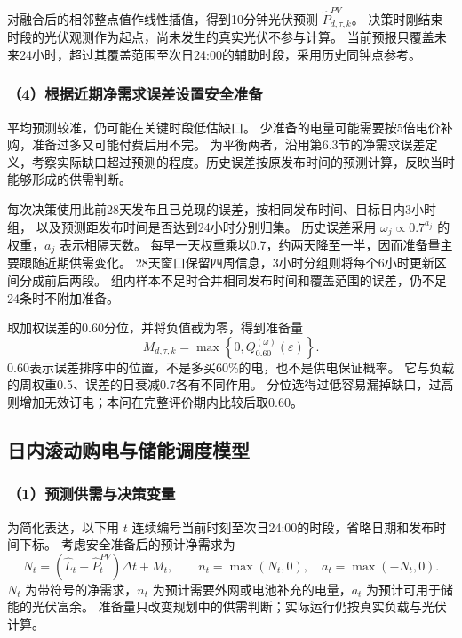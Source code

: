 对融合后的相邻整点值作线性插值，得到10分钟光伏预测 $\widehat P^{PV}_{d,\tau,k}$。
决策时刚结束时段的光伏观测作为起点，尚未发生的真实光伏不参与计算。
当前预报只覆盖未来24小时，超过其覆盖范围至次日24:00的辅助时段，采用历史同钟点参考。

\subsubsection*{（4）根据近期净需求误差设置安全准备}

平均预测较准，仍可能在关键时段低估缺口。
少准备的电量可能需要按5倍电价补购，准备过多又可能付费后用不完。
为平衡两者，沿用第6.3节的净需求误差定义，考察实际缺口超过预测的程度。历史误差按原发布时间的预测计算，反映当时能够形成的供需判断。

每次决策使用此前28天发布且已兑现的误差，按相同发布时间、目标日内3小时组，
以及预测距发布时间是否达到24小时分别归集。
历史误差采用 $\omega_j\propto0.7^{a_j}$ 的权重，$a_j$ 表示相隔天数。
每早一天权重乘以0.7，约两天降至一半，因而准备量主要跟随近期供需变化。
28天窗口保留四周信息，3小时分组则将每个6小时更新区间分成前后两段。
组内样本不足时合并相同发布时间和覆盖范围的误差，仍不足24条时不附加准备。

取加权误差的0.60分位，并将负值截为零，得到准备量
\begin{equation}
M_{d,\tau,k}=\max\left\{0,Q_{0.60}^{(\omega)}(\varepsilon)\right\}.
\end{equation}
0.60表示误差排序中的位置，不是多买60\%的电，也不是供电保证概率。
它与负载的周权重0.5、误差的日衰减0.7各有不同作用。
分位选得过低容易漏掉缺口，过高则增加无效订电；本问在完整评价期内比较后取0.60。

\subsection{日内滚动购电与储能调度模型}

\subsubsection*{（1）预测供需与决策变量}

为简化表达，以下用 $t$ 连续编号当前时刻至次日24:00的时段，省略日期和发布时间下标。
考虑安全准备后的预计净需求为
\begin{equation}
N_t=(\widehat L_t-\widehat P^{PV}_t)\Delta t+M_t,\qquad
n_t=\max(N_t,0),\quad a_t=\max(-N_t,0).
\end{equation}
$N_t$ 为带符号的净需求，$n_t$ 为预计需要外网或电池补充的电量，$a_t$ 为预计可用于储能的光伏富余。
准备量只改变规划中的供需判断；实际运行仍按真实负载与光伏计算。

